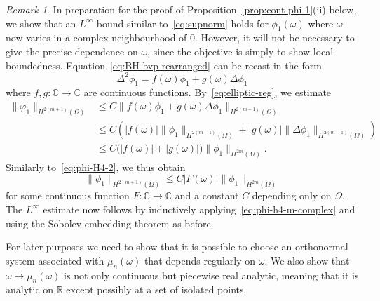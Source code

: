 \documentclass[a4paper, reqno,titlepage]{amsart}
\numberwithin{equation}{section}
\theoremstyle{plain}
\theoremstyle{definition}
\theoremstyle{remark}
\newtheorem{remark}[theorem]{Remark}
\newcommand{\RR}{\mathbb{R}}
\newcommand{\CC}{\mathbb{C}}
\begin{document}
\begin{remark}
  \label{rmk:complex-omega}
  In preparation for the proof of Proposition~\ref{prop:cont-phi-1}(ii) below, we show that an $L^\infty$ bound similar to~\eqref{eq:supnorm} holds for $\phi_1(\omega)$ where $\omega$ now varies in a complex neighbourhood of 0. However, it will not be necessary to give the precise dependence on $\omega$, since the objective is simply to show local boundedness. Equation~\eqref{eq:BH-bvp-rearranged} can be recast in the form
  \begin{displaymath}
    \Delta^2 \phi_1 = f(\omega)\phi_1 + g(\omega) \Delta\phi_1
  \end{displaymath}
  where $f, g\colon \CC \to \CC$ are continuous functions. By~\eqref{eq:elliptic-reg}, we estimate
  \begin{displaymath}
    \begin{aligned}
      \| \varphi_1 \|_{H^{2(m+1)}(\Omega)} & \leq C \|f(\omega) \phi_1+g(\omega)\Delta\phi_1\|_{H^{2(m-1)}(\Omega)}                         \\
                                           & \leq C \left( |f(\omega)| \|\phi_1\|_{H^{2(m-1)}(\Omega)} + |g(\omega)| \| \Delta\phi_1 \|_{H^{2(m-1)}(\Omega)} \right) \\
                                           & \leq C\bigl(|f(\omega)| + |g(\omega)|\bigr) \|\phi_1\|_{H^{2m}(\Omega)}.
    \end{aligned}
  \end{displaymath}
  Similarly to~\eqref{eq:phi-H4-2}, we thus obtain
  \begin{equation}
    \label{eq:phi-h4-m-complex}
    \| \phi_1 \|_{H^{2(m+1)}(\Omega)} \leq C |F(\omega)| \| \phi_1 \|_{H^{2m}(\Omega)}
  \end{equation}
  for some continuous function $F\colon \CC \to \CC$ and a constant $C$ depending only on $\Omega$. The $L^\infty$ estimate now follows by inductively applying~\eqref{eq:phi-h4-m-complex} and using the Sobolev embedding theorem as before.
\end{remark}

For later purposes we need to show that it is possible to choose an orthonormal system associated with $\mu_n(\omega)$ that depends regularly on $\omega$. We also show that $\omega\mapsto\mu_n(\omega)$ is not only continuous but piecewise real analytic, meaning that it is analytic on $\RR$ except possibly at a set of isolated points.
\end{document}
